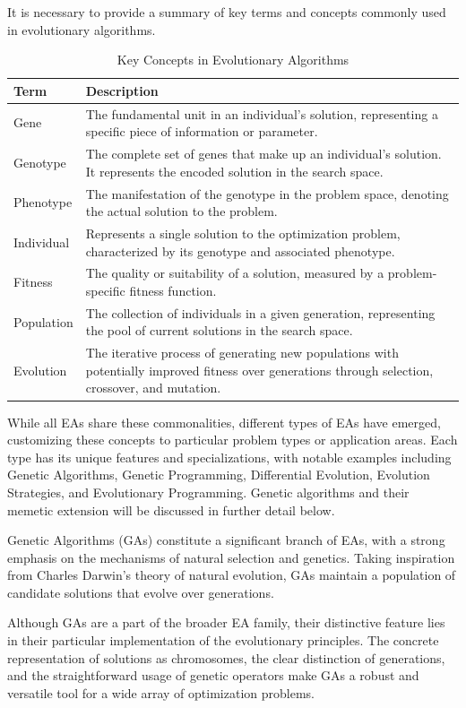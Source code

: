 \documentclass[twoside]{ctuthesis}
\theoremstyle{plain}
\theoremstyle{definition}
\theoremstyle{note}
\begin{document}
It is necessary to provide a summary of key terms and concepts commonly used in evolutionary algorithms.
\begin{table}[htbp]
	\caption{Key Concepts in Evolutionary Algorithms}
	\label{tab:key-concepts}
	\begin{tabularx}{\textwidth}{lX}
		\hline
		\textbf{Term} & \textbf{Description} \\
		\hline
		Gene & The fundamental unit in an individual's solution, representing a specific piece of information or parameter. \\
		Genotype & The complete set of genes that make up an individual's solution. It represents the encoded solution in the search space. \\
		Phenotype & The manifestation of the genotype in the problem space, denoting the actual solution to the problem. \\
		Individual & Represents a single solution to the optimization problem, characterized by its genotype and associated phenotype. \\
		Fitness & The quality or suitability of a solution, measured by a problem-specific fitness function. \\
		Population & The collection of individuals in a given generation, representing the pool of current solutions in the search space. \\
		Evolution & The iterative process of generating new populations with potentially improved fitness over generations through selection, crossover, and mutation. \\
		\hline
	\end{tabularx}
\end{table}


While all EAs share these commonalities, different types of EAs have emerged, customizing these concepts to particular problem types or application areas. Each type has its unique features and specializations, with notable examples including Genetic Algorithms, Genetic Programming, Differential Evolution, Evolution Strategies, and Evolutionary Programming. Genetic algorithms and their memetic extension will be discussed in further detail below.

Genetic Algorithms (GAs) constitute a significant branch of EAs, with a strong emphasis on the mechanisms of natural selection and genetics. Taking inspiration from Charles Darwin's theory of natural evolution, GAs maintain a population of candidate solutions that evolve over generations.

Although GAs are a part of the broader EA family, their distinctive feature lies in their particular implementation of the evolutionary principles. The concrete representation of solutions as chromosomes, the clear distinction of generations, and the straightforward usage of genetic operators make GAs a robust and versatile tool for a wide array of optimization problems.
\end{document}

